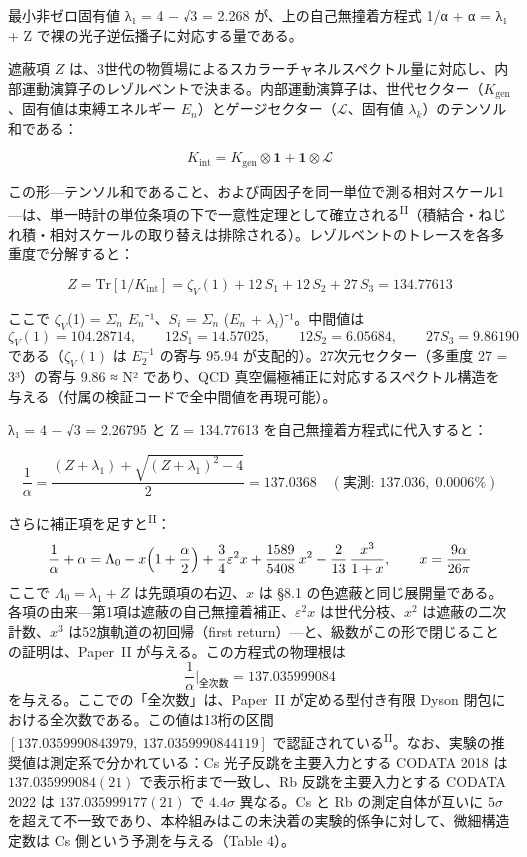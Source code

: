 \documentclass[fontsize=11pt,paper=a4,lualatex]{jlreq}
\newcommand{\PII}{\textsuperscript{\textup{II}}}
\begin{document}
最小非ゼロ固有値 λ₁ = 4 − √3 = 2.268 が、上の自己無撞着方程式 1/α + α = λ₁ + Z で裸の光子逆伝播子に対応する量である。

遮蔽項 $Z$ は、3世代の物質場によるスカラーチャネルスペクトル量に対応し、内部運動演算子のレゾルベントで決まる。内部運動演算子は、世代セクター（$K_\mathrm{gen}$、固有値は束縛エネルギー
\textbar $E_n$\textbar）とゲージセクター（$\mathcal{L}$、固有値
$\lambda_k$）のテンソル和である：

\[K_\mathrm{int} = K_\mathrm{gen} \otimes \mathbf{1} + \mathbf{1} \otimes \mathcal{L}\]

この形---テンソル和であること、および両因子を同一単位で測る相対スケール1---は、単一時計の単位条項の下で一意性定理として確立される\PII{}（積結合・ねじれ積・相対スケールの取り替えは排除される）。レゾルベントのトレースを各多重度で分解すると：

\[Z = \mathrm{Tr}[1/K_\mathrm{int}] = \zeta_V(1) + 12\,S_1 + 12\,S_2 + 27\,S_3 = 134.77613\]

ここで $\zeta_V$(1) = $\Sigma_n$ \textbar $E_n$\textbar⁻¹、$S_i$ = $\Sigma_n$
(\textbar $E_n$\textbar{} + $\lambda_i$)⁻¹。中間値は
\[\zeta_V(1) = 104.28714,\qquad 12S_1 = 14.57025,\qquad 12S_2 = 6.05684,\qquad 27S_3 = 9.86190\]
である（$\zeta_V(1)$ は $E_2^{-1}$ の寄与 95.94 が支配的）。27次元セクター（多重度 27 =
3³）の寄与 9.86 ≈ N² であり、QCD 真空偏極補正に対応するスペクトル構造を与える（付属の検証コードで全中間値を再現可能）。

λ₁ = 4 − √3 = 2.26795 と Z = 134.77613 を自己無撞着方程式に代入すると：

\[\frac{1}{\alpha} = \frac{(Z + \lambda_1) + \sqrt{(Z + \lambda_1)^2 - 4}}{2} = 137.0368 \quad (\text{実測: } 137.036,\; 0.0006\%)\]

さらに補正項を足すと\PII{}：
\[\frac{1}{\alpha} + \alpha = \Lambda_0 - x\Bigl(1+\frac{\alpha}{2}\Bigr) + \frac{3}{4}\varepsilon^2 x + \frac{1589}{5408}\,x^2 - \frac{2}{13}\,\frac{x^3}{1+x},\qquad x = \frac{9\alpha}{26\pi}\]
ここで $\Lambda_0 = \lambda_1 + Z$ は先頭項の右辺、$x$ は §8.1 の色遮蔽と同じ展開量である。各項の由来---第1項は遮蔽の自己無撞着補正、$\varepsilon^2 x$ は世代分枝、$x^2$ は遮蔽の二次計数、$x^3$ は52旗軌道の初回帰（first return）---と、級数がこの形で閉じることの証明は、Paper~II が与える。この方程式の物理根は
\[\frac{1}{\alpha}\Big|_{\text{全次数}} = 137.035999084\]
を与える。ここでの「全次数」は、Paper~II が定める型付き有限 Dyson 閉包における全次数である。この値は13桁の区間 $[137.0359990843979,\ 137.0359990844119]$ で認証されている\PII{}。なお、実験の推奨値は測定系で分かれている：Cs 光子反跳を主要入力とする CODATA 2018 は $137.035999084(21)$ で表示桁まで一致し、Rb 反跳を主要入力とする CODATA 2022 は $137.035999177(21)$ で $4.4\sigma$ 異なる。Cs と Rb の測定自体が互いに $5\sigma$ を超えて不一致であり、本枠組みはこの未決着の実験的係争に対して、微細構造定数は Cs 側という予測を与える（Table 4）。
\end{document}
